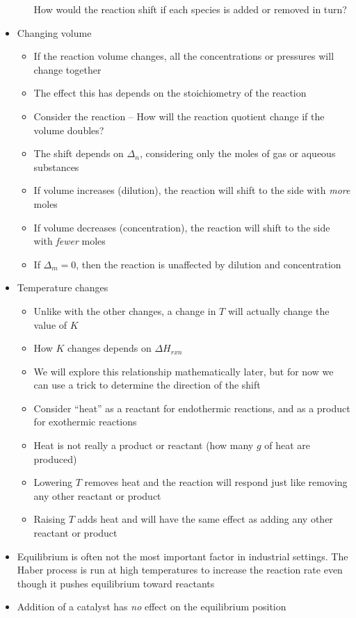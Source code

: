 \documentclass[12pt, openany, letterpaper]{memoir}
\begin{document}
\begin{itemize}
\begin{itemize}
		How would the reaction shift if each species is added or removed in turn?
	\end{itemize}
	\item Changing volume
	\begin{itemize}
		\item If the reaction volume changes, all the concentrations or pressures will change together
		\item The effect this has depends on the stoichiometry of the reaction
		\item Consider the reaction  -- How will the reaction quotient change if the volume doubles?
		\item The shift depends on $\Delta_n$, considering only the moles of gas or aqueous substances
		\item If volume increases (dilution), the reaction will shift to the side with \emph{more} moles
		\item If volume decreases (concentration), the reaction will shift to the side with \emph{fewer} moles
		\item If $\Delta_m=0$, then the reaction is unaffected by dilution and concentration
	\end{itemize}
	\item Temperature changes
	\begin{itemize}
		\item Unlike with the other changes, a change in $T$ will actually change the value of $K$
		\item How $K$ changes depends on $\Delta H_{rxn}$
		\item We will explore this relationship mathematically later, but for now we can use a trick to determine the direction of the shift
		\item Consider ``heat'' as a reactant for endothermic reactions, and as a product for exothermic reactions
		\item Heat is not really a product or reactant (how many $g$ of heat are produced)
		\item Lowering $T$ removes heat and the reaction will respond just like removing any other reactant or product
		\item Raising $T$ adds heat and will have the same effect as adding any other reactant or product
	\end{itemize}
	\item Equilibrium is often not the most important factor in industrial settings. The Haber process is run at high temperatures to increase the reaction rate even though it pushes equilibrium toward reactants
	\item Addition of a catalyst has \emph{no} effect on the equilibrium position
\end{itemize}
\end{document}
